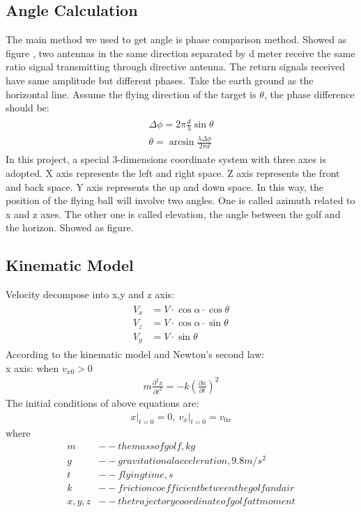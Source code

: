 \subsection{Angle Calculation}
The main method we used to get angle is phase comparison method. Showed as figure , two antennas in the same direction separated by d meter receive the same ratio signal transmitting through directive antenna. The return signals received have same amplitude but different phases. Take the earth ground as the horizontal line. Assume the flying direction of the target is $\theta$, the phase difference should be:
\begin{align}
\begin{split}
\Delta \phi=2 \pi \frac{d}{\lambda} \sin \theta\\
\theta=\arcsin \frac{\lambda \Delta \phi}{2 \pi d}
\end{split}
\end{align}
In this project, a special 3-dimensions coordinate system with three axes is adopted. X axis represents the left and right space. Z axis represents the front and back space. Y axis represents the up and down space. In this way, the position of the flying ball will involve two angles. One is called azimuth related to x and z axes. The other one is called elevation, the angle between the golf and the horizon. Showed as figure.


\subsection{Kinematic Model}
Velocity decompose into x,y and z axis:
\begin{align}
\begin{split}
    V_{x}&=V \cdot \cos \alpha \cdot \cos \theta\\
    V_{z}&=V \cdot \cos \alpha \cdot \sin \theta\\
    V_{y}&=V \cdot \sin \theta    
\end{split}
\end{align}
According to the kinematic model and Newton’s second law:\\
x axis:
when $v_{x 0}>0$
\begin{align}
    m \frac{\partial^{2} x}{\partial t^{2}}=-k\left(\frac{\partial x}{\partial t}\right)^{2}
\end{align}
The initial conditions of above equations are:
\begin{align}
    \left.x\right|_{t=0}=0,\ \left.v_{x}\right|_{t=0}=v_{0 x}
\end{align}
where
\begin{align*}
      m &-- the mass of golf,kg\\
      g &-- gravitational acceleration, 9.8m/s^2\\
      t &-- flying time, s\\
      k &-- friction coefficient between the golf and air\\
      x,y,z &--the trajectory coordinate of golf at t moment   
\end{align*}



